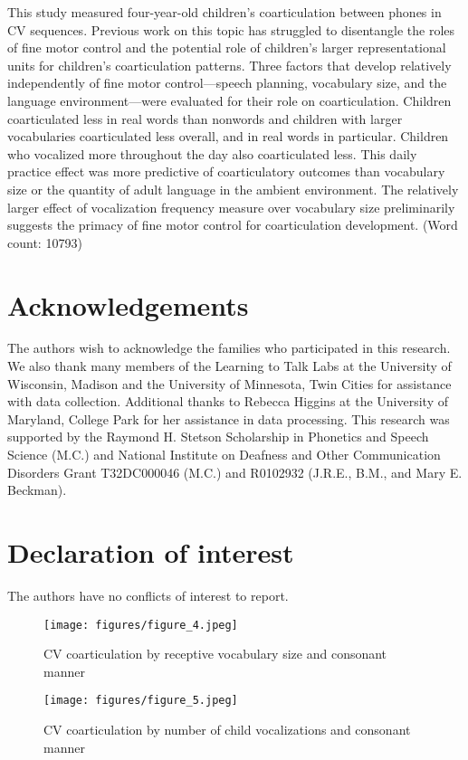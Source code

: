 \documentclass[a4paper,man,natbib,donotrepeattitle, apacite]{apa6}
\begin{document}
This study measured four-year-old children’s coarticulation between phones in CV sequences. Previous work on this topic has struggled to disentangle the roles of fine motor control and the potential role of children’s larger representational units for children’s coarticulation patterns. Three factors that develop relatively independently of fine motor control---speech planning, vocabulary size, and the language environment---were evaluated for their role on coarticulation. Children coarticulated less in real words than nonwords and children with larger vocabularies coarticulated less overall, and in real words in particular. Children who vocalized more throughout the day also coarticulated less. This daily practice effect was more predictive of coarticulatory outcomes than vocabulary size or the quantity of adult language in the ambient environment. The relatively larger effect of vocalization frequency measure over vocabulary size preliminarily suggests the primacy of fine motor control for coarticulation development. (Word count: 10793)

\section{Acknowledgements}

The authors wish to acknowledge the families who participated in this research. We also thank many members of the Learning to Talk Labs at the University of Wisconsin, Madison and the University of Minnesota, Twin Cities for assistance with data collection. Additional thanks to Rebecca Higgins at the University of Maryland, College Park for her assistance in data processing. This research was supported by the Raymond H. Stetson Scholarship in Phonetics and Speech Science (M.C.) and National Institute on Deafness and Other Communication Disorders Grant T32DC000046 (M.C.) and R0102932 (J.R.E., B.M., and Mary E. Beckman).   

\section{Declaration of interest}

The authors have no conflicts of interest to report. 





\begin{figure}[H]
\centering
\texttt{[image: figures/figure\_4.jpeg]}
\caption{\label{fig:figure-4}CV coarticulation by receptive vocabulary size and consonant manner}
\end{figure}

\begin{figure}[H]
\centering
\texttt{[image: figures/figure\_5.jpeg]}
\caption{\label{fig:figure-5}CV coarticulation by number of child vocalizations and consonant manner}
\end{figure}
\end{document}
